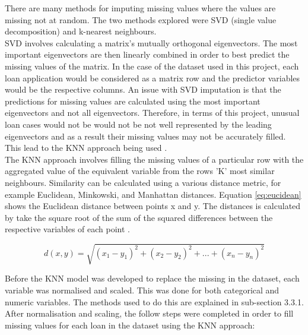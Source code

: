 There are many methods for imputing missing values where the values are missing not at random. The two methods explored were SVD (single value decomposition) and k-nearest neighbours. \\

SVD involves calculating a matrix's mutually orthogonal eigenvectors. The most important eigenvectors are then linearly combined in order to best predict the missing values of the matrix. In the case of the dataset used in this project, each loan application would be considered as a matrix row and the predictor variables would be the respective columns. An issue with SVD imputation is that the predictions for missing values are calculated using the most important eigenvectors and not all eigenvectors. Therefore, in terms of this project, unusual loan cases would not be would not be not well represented by the leading eigenvectors and as a result their missing values may not be accurately filled. This lead to the KNN approach being used \parencite{MissingValuesStandford}. \\

The KNN approach involves filling the missing values of a particular row with the aggregated value of the equivalent variable from the rows 'K' most similar neighbours. Similarity can be calculated using a various distance metric, for example Euclidean, Minkowski, and Manhattan distances. Equation \ref{eq:eucidean} shows the Euclidean distance between points x and y. The distances is calculated by take the square root of the sum of the squared differences between the respective variables of each point \parencite{EuclideanDist}. 

\vspace{10pt}

\begin{equation} \label{eq:eucidean}
d(x,y)=\sqrt{(x_{1}-y_{1})^{2} + (x_{2}-y_{2})^{2} + ... + (x_{n}-y_{n})^{2}}
\end{equation}

\vspace{10pt}

Before the KNN model was developed to replace the missing in the dataset, each variable was normalised and scaled. This was done for both categorical and numeric variables. The methods used to do this are explained in sub-section 3.3.1.\\

After normalisation and scaling, the follow steps were completed in order to fill missing values for each loan in the dataset using the KNN approach: 

